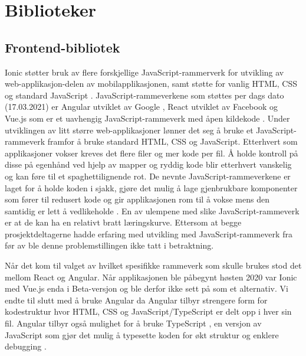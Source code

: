 \section{Biblioteker}
\subsection{Frontend-bibliotek}
Ionic støtter bruk av flere forskjellige JavaScript-rammerverk for utvikling av web-applikasjon-delen av mobilapplikasjonen, samt støtte for vanlig HTML, CSS og standard JavaScript \cite{IonicCrossPlatformMobile}. JavaScript-rammeverkene som støttes per dags dato (17.03.2021) er Angular utviklet av Google \cite{Angular}, React utviklet av Facebook \cite{ReactNativeFramework} og Vue.js som er et uavhengig JavaScript-rammeverk med åpen kildekode \cite{VuejsVue2021}. Under utviklingen av litt større web-applikasjoner lønner det seg å bruke et JavaScript-rammeverk framfor å bruke standard HTML, CSS og JavaScript. Etterhvert som applikasjoner vokser kreves det flere filer og mer kode per fil. Å holde kontroll på disse på egenhånd ved hjelp av mapper og ryddig kode blir etterhvert vanskelig og kan føre til et spaghettilignende rot. De nevnte JavaScript-rammeverkene er laget for å holde koden i sjakk, gjøre det mulig å lage gjenbrukbare komponenter som fører til redusert kode og gir applikasjonen rom til å vokse mens den samtidig er lett å vedlikeholde \cite{aboutJavaScriptFrameworks}. En av ulempene med slike JavaScript-rammeverk er at de kan ha en relativt bratt læringskurve. Ettersom at begge prosjektdeltagerne hadde erfaring med utvikling med JavaScript-rammeverk fra før av ble denne problemstillingen ikke tatt i betraktning.
\newline

\noindent
Når det kom til valget av hvilket spesifikke rammeverk som skulle brukes stod det mellom React og Angular. Når applikasjonen ble påbegynt høsten 2020 var Ionic med Vue.js enda i Beta-versjon \cite{AnnouncingNewIonic} og ble derfor ikke sett på som et alternativ. Vi endte til slutt med å bruke Angular da Angular tilbyr strengere form for kodestruktur hvor HTML, CSS og JavaScript/TypeScript er delt opp i hver sin fil. Angular tilbyr også mulighet for å bruke TypeScript \cite{TypeScriptTypedJavaScript}, en versjon av JavaScript som gjør det mulig å typesette koden for økt struktur og enklere debugging \cite{AngularWhatAngular}.

